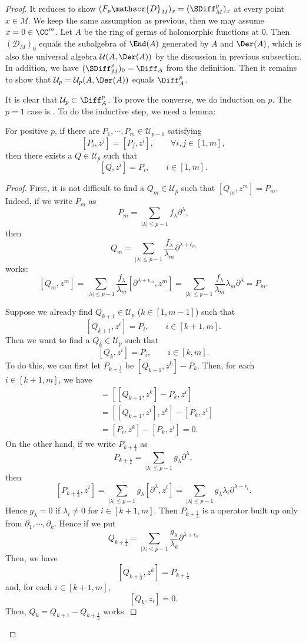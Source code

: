 \begin{proof}
It reduces to show $(F_p\mathscr{D}_M)_x=(\SDiff_M^p)_x$ at every point $x\in M$. 
We keep the same assumption as previous, then we may assume $x=0\in\CC^m$. 
Let $A$ be the ring of germs of holomorphic functions at $0$. 
Then $(\mathscr{D}_M)_0$ equals 
the subalgebra of $\End(A)$ generated by $A$ and $\Der(A)$, 
which is also the universal algebra $\mathcal{U}(A,\Der(A))$ 
by the discussion in previous subsection. 
In addition, we have $(\SDiff_M^p)_0=\Diff_A$ from the definition.
Then it remains to show that 
$\mathcal{U}_p=\mathcal{U}_p(A,\Der(A))$ equals $\Diff_A^p$. 

It is clear that $\mathcal{U}_p\subset\Diff_A^p$. To prove the converse, 
we do induction on $p$. The $p=1$ case is . 
To do the inductive step, we need a lemma:

\begin{lem}
For positive $p$, if there are $P_1,\cdots,P_m\in\mathcal{U}_{p-1}$ satisfying 
\[
[P_i,z^j]=[P_j,z^i],\qquad\forall i,j\in[1,m],
\]
then there exists a $Q\in\mathcal{U}_p$ such that
\[
[Q,z^i]=P_i,\qquad i\in[1,m].
\]
\end{lem}
\begin{proof}
First, it is not difficult to find a $Q_m\in\mathcal{U}_p$ 
such that $[Q_m,z^m]=P_m$. 
Indeed, if we write $P_m$ as
\[
P_m=\sum_{|\lambda|\le p-1}f_\lambda\partial^\lambda,
\]
then
\[
Q_m=\sum_{|\lambda|\le p-1}
\frac{f_\lambda}{\lambda_m}\partial^{\lambda+\epsilon_m}
\]
works: 
\[
[Q_m,z^m]=\sum_{|\lambda|\le p-1}
\frac{f_\lambda}{\lambda_m}[\partial^{\lambda+\epsilon_m},z^m]
=\sum_{|\lambda|\le p-1}\frac{f_\lambda}{\lambda_m}\lambda_m\partial^\lambda
=P_m.
\]

Suppose we already find $Q_{k+1}\in\mathcal{U}_p$ ($k\in[1,m-1]$) such that 
\[
[Q_{k+1},z^i]=P_i,\qquad i\in[k+1,m].
\]
Then we want to find a $Q_k\in\mathcal{U}_p$ such that 
\[
[Q_k,z^i]=P_i,\qquad i\in[k,m].
\]
To do this, we can first let $P_{k+\frac12}$ be $[Q_{k+1},z^k]-P_k$. 
Then, for each $i\in[k+1,m]$, we have 
\begin{align*}
[P_{k+\frac12},z^i]&=[[Q_{k+1},z^k]-P_k,z^i]\\
&=[[Q_{k+1},z^i],z^k]-[P_k,z^i]\\
&=[P_i,z^k]-[P_k,z^i]=0.
\end{align*}
On the other hand, if we write $P_{k+\frac12}$ as
\[
P_{k+\frac12}=\sum_{|\lambda|\le p-1}g_\lambda\partial^\lambda,
\]
then
\[
[P_{k+\frac12},z^i]=\sum_{|\lambda|\le p-1}g_\lambda[\partial^\lambda,z^i]
=\sum_{|\lambda|\le p-1}g_\lambda\lambda_i\partial^{\lambda-\epsilon_i}.
\]
Hence $g_\lambda=0$ if $\lambda_i\neq0$ for $i\in[k+1,m]$. 
Then $P_{k+\frac12}$ is a operator built up only from 
$\partial_1,\cdots,\partial_k$. Hence if we put
\[
Q_{k+\frac12}=\sum_{|\lambda|\le p-1}
\frac{g_\lambda}{\lambda_k}\partial^{\lambda+\epsilon_k}
\]
Then, we have
\[
[Q_{k+\frac12},z^k]=P_{k+\frac12}
\]
and, for each $i\in[k+1,m]$, 
\[
[Q_k,z_i]=0.
\]
Then, $Q_k=Q_{k+1}-Q_{k+\frac12}$ works. 


\end{proof}
\end{proof}
